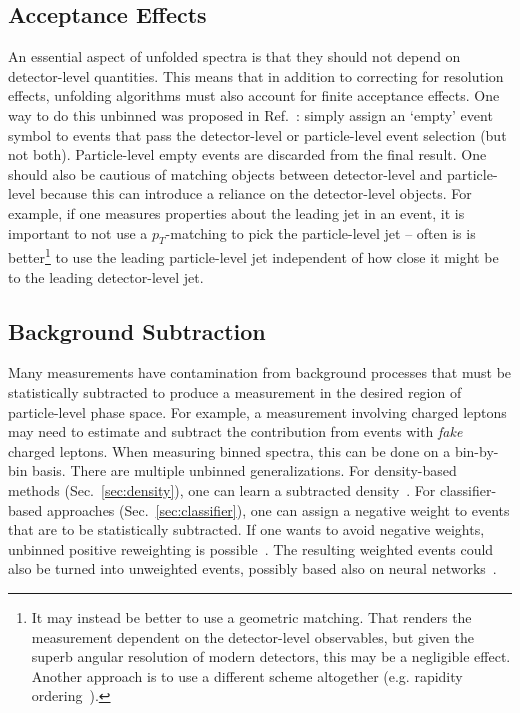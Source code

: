 \documentclass[a4paper,11pt]{article}
\begin{document}
\subsection{Acceptance Effects}

An essential aspect of unfolded spectra is that they should not depend on detector-level quantities.  This means that in addition to correcting for resolution effects, unfolding algorithms must also account for finite acceptance effects.  One way to do this unbinned was proposed in Ref.~\cite{Andreassen:2021zzk}: simply assign an `empty' event symbol to events that pass the detector-level or particle-level event selection (but not both).  Particle-level empty events are discarded from the final result.  One should also be cautious of matching objects between detector-level and particle-level because this can introduce a reliance on the detector-level objects.  For example, if one measures properties about the leading jet in an event, it is important to not use a $p_T$-matching to pick the particle-level jet -- often is is better\footnote{It may instead be better to use a geometric matching.  That renders the measurement dependent on the detector-level observables, but given the superb angular resolution of modern detectors, this may be a negligible effect.  Another approach is to use a different scheme altogether (e.g. rapidity ordering~\cite{1509.05190}).} to use the leading particle-level jet independent of how close it might be to the leading detector-level jet.

\subsection{Background Subtraction}

Many measurements have contamination from background processes that must be statistically subtracted to produce a measurement in the desired region of particle-level phase space.  For example, a measurement involving charged leptons may need to estimate and subtract the contribution from events with \textit{fake} charged leptons.  When measuring binned spectra, this can be done on a bin-by-bin basis.  There are multiple unbinned generalizations.  For density-based methods (Sec.~\ref{sec:density}), one can learn a subtracted density~\cite{Butter:2019eyo}.  For classifier-based approaches (Sec.~\ref{sec:classifier}), one can assign a negative weight to events that are to be statistically subtracted.  If one wants to avoid negative weights, unbinned positive reweighting is possible~\cite{Nachman:2020fff}.  The resulting weighted events could also be turned into unweighted events, possibly based also on neural networks~\cite{Backes:2020vka, Stienen:2020gns}.
\end{document}
